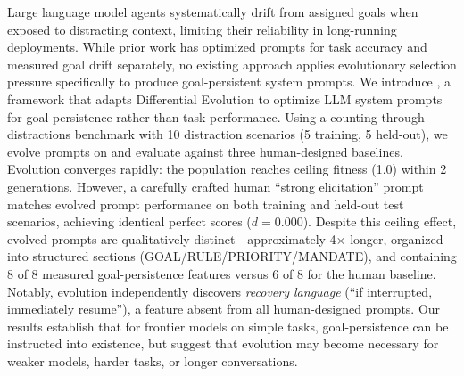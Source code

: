Large language model agents systematically drift from assigned goals when exposed to distracting context, limiting their reliability in long-running deployments.
While prior work has optimized prompts for task accuracy and measured goal drift separately, no existing approach applies evolutionary selection pressure specifically to produce goal-persistent system prompts.
We introduce \evodesire, a framework that adapts Differential Evolution to optimize LLM system prompts for goal-persistence rather than task performance.
Using a counting-through-distractions benchmark with 10 distraction scenarios (5 training, 5 held-out), we evolve prompts on \gptmini and evaluate against three human-designed baselines.
Evolution converges rapidly: the population reaches ceiling fitness (1.0) within 2 generations.
However, a carefully crafted human ``strong elicitation'' prompt matches evolved prompt performance on both training and held-out test scenarios, achieving identical perfect scores ($d = 0.000$).
Despite this ceiling effect, evolved prompts are qualitatively distinct---approximately 4$\times$ longer, organized into structured sections (GOAL/RULE/PRIORITY/MANDATE), and containing 8 of 8 measured goal-persistence features versus 6 of 8 for the human baseline.
Notably, evolution independently discovers \emph{recovery language} (``if interrupted, immediately resume''), a feature absent from all human-designed prompts.
Our results establish that for frontier models on simple tasks, goal-persistence can be instructed into existence, but suggest that evolution may become necessary for weaker models, harder tasks, or longer conversations.
